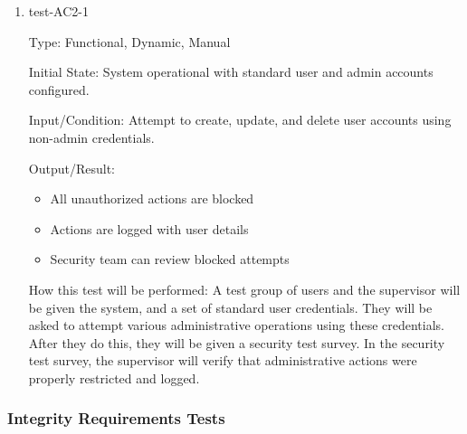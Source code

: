 \documentclass[12pt, titlepage]{article}
\begin{document}
\begin{enumerate}
    \item{test-AC2-1}  \label{test-AC2-1}
    
    Type: Functional, Dynamic, Manual
    
    Initial State: System operational with standard user and admin accounts configured.
    
    Input/Condition: Attempt to create, update, and delete user accounts using non-admin credentials.
    
    Output/Result:
    \begin{itemize}
        \item All unauthorized actions are blocked
        \item Actions are logged with user details
        \item Security team can review blocked attempts
    \end{itemize}
    
    How this test will be performed: A test group of users and the supervisor will be given the system, and a set of standard user credentials. They will be asked to attempt various administrative operations using these credentials. After they do this, they will be given a security test survey. In the security test survey, the supervisor will verify that administrative actions were properly restricted and logged.

\end{enumerate}


\subsubsection{Integrity Requirements Tests} \label{section:4.3.2}
\end{document}
